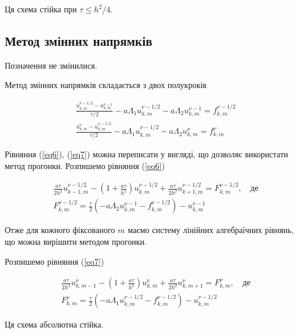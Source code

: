 \documentclass[a4paper,12pt]{article}
\begin{document}
Ця схема стійка при $\tau \le h^2/4$.

\subsection{Метод змінних напрямків}

Позначення не змінилися.

Метод змінних напрямків складається з двох полукроків

\begin{align}
	&\frac{u_{k,m}^{\nu- 1/2} - u_{k,m}^{\nu -1}}{\tau/2} - a \Lambda_1 u_{k,m}^{\nu -1/2} - a \Lambda_2 u_{k,m}^{\nu-1} = f_{k,m}^{\nu- 1/2} \label{eq6} \\
	&\frac{u_{k,m}^{\nu} - u_{k,m}^{\nu -1/2}}{\tau/2} - a \Lambda_1 u_{k,m}^{\nu -1/2} - a \Lambda_2 u_{k,m}^{\nu} = f_{k,m}^{\nu} \label{eq7}
\end{align}

Рівняння (\ref{eq6}), (\ref{eq7}) можна переписати у вигляді, що дозволяє використати метод прогонки. Розпишемо рівняння (\ref{eq6})

\begin{equation}
	\begin{aligned}
		&\frac{a \tau}{2 h^2} u_{k-1,m}^{\nu - 1/2} - \left( 1 + \frac{a \tau}{h^2} \right) u_{k,m}^{\nu -1/2} + \frac{a \tau}{2h^2} u_{k+1,m}^{\nu -1/2} = F_{k,m}^{\nu -1/2}, \quad \text{де} \\
		&F_{k,m}^{\nu -1/2} = \frac{\tau}{2} \left( -a\Lambda_2 u_{k,m}^{\nu -1} -f_{k,m}^{\nu- 1/2} \right) - u_{k,m}^{\nu -1}
	\end{aligned} \nonumber
\end{equation}

Отже для кожного фіксованого $m$ маємо систему лінійних алгебраїчних рівнянь, що можна вирішити методом прогонки.

Розпишемо рівняння (\ref{eq7})

\begin{equation}
	\begin{aligned}
		&\frac{a \tau}{2 h^2} u_{k,m-1}^{\nu} - \left( 1 + \frac{a \tau}{h^2} \right) u_{k,m}^{\nu} + \frac{a \tau}{2h^2} u_{k,m+1}^{\nu} = F_{k,m}^{\nu}, \quad \text{де} \\
		&F_{k,m}^{\nu} = \frac{\tau}{2} \left( -a\Lambda_1 u_{k,m}^{\nu -1/2} -f_{k,m}^{\nu- 1/2} \right) - u_{k,m}^{\nu -1/2}
	\end{aligned} \nonumber
\end{equation}

Ця схема абсолютна стійка.
\end{document}
